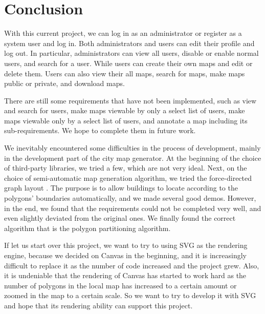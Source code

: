 \section{Conclusion}
\label{sec:Conclusion}
With this current project, we can log in as an administrator or register as a system user and log in. Both administrators and users can edit their profile and log out. In particular, administrators can view all users, disable or enable normal users, and search for a user. While users can create their own maps and edit or delete them. Users can also view their all maps, search for maps, make maps public or private, and download maps.

There are still some requirements that have not been implemented, such as view and search for users, make maps viewable by only a select list of users, make maps viewable only by a select list of users, and annotate a map including its sub-requirements. We hope to complete them in future work.

We inevitably encountered some difficulties in the process of development, mainly in the development part of the city map generator. At the beginning of the choice of third-party libraries, we tried a few, which are not very ideal. Next, on the choice of semi-automatic map generation algorithm, we tried the force-directed graph layout \cite{web:D3-force}. The purpose is to allow buildings to locate according to the polygons' boundaries automatically, and we made several good demos. However, in the end, we found that the requirements could not be completed very well, and even slightly deviated from the original ones. We finally found the correct algorithm that is the polygon partitioning algorithm.

If let us start over this project, we want to try to using SVG as the rendering engine, because we decided on Canvas in the beginning, and it is increasingly difficult to replace it as the number of code increased and the project grew. Also, it is undeniable that the rendering of Canvas has started to work hard as the number of polygons in the local map has increased to a certain amount or zoomed in the map to a certain scale. So we want to try to develop it with SVG and hope that its rendering ability can support this project.

